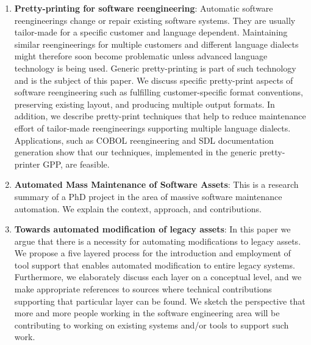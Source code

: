 \begin{englishtext}
\begin{enumerate}
    \item \textbf{Pretty-printing for software reengineering}: Automatic
    software reengineerings change or repair existing software systems. They are
    usually tailor-made for a specific customer and language dependent.
    Maintaining similar reengineerings for multiple customers and different
    language dialects might therefore soon become problematic unless advanced
    language technology is being used. Generic pretty-printing is part of such
    technology and is the subject of this paper. We discuss specific
    pretty-print aspects of software reengineering such as fulfilling
    customer-specific format conventions, preserving existing layout, and
    producing multiple output formats. In addition, we describe pretty-print
    techniques that help to reduce maintenance effort of tailor-made
    reengineerings supporting multiple language dialects. Applications, such as
    COBOL reengineering and SDL documentation generation show that our
    techniques, implemented in the generic pretty-printer GPP, are feasible.
    \cite{prettyPrinting}

    \item \textbf{Automated Mass Maintenance of Software Assets}: This is a
    research summary of a PhD project in the area of massive software
    maintenance automation. We explain the context, approach, and contributions.
    \cite{massMaintenance}

    \item \textbf{Towards automated modification of legacy assets}: In this
    paper we argue that there is a necessity for automating modifications to
    legacy assets. We propose a five layered process for the introduction and
    employment of tool support that enables automated modification to entire
    legacy systems. Furthermore, we elaborately discuss each layer on a
    conceptual level, and we make appropriate references to sources where
    technical contributions supporting that particular layer can be found. We
    sketch the perspective that more and more people working in the software
    engineering area will be contributing to working on existing systems and/or
    tools to support such work. \cite{legacyAssets}


\end{enumerate}
\end{englishtext}

